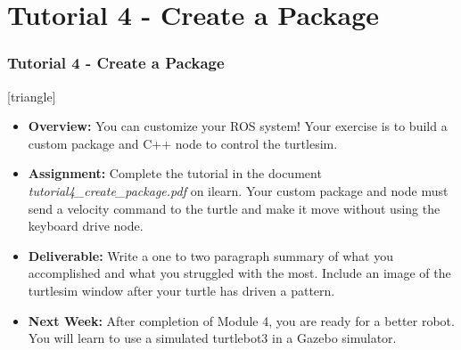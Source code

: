 \documentclass[fleqn]{beamer} %
\newcommand{\sectiontitleIV}{Tutorial 4 - Create a Package}
\begin{document}
\section{\sectiontitleIV}	
	            \begin{frame}[label=sectionIV] \small
		\frametitle{\sectiontitleIV}    
	
 [triangle]
                \begin{itemize}

					\item {\bf Overview:} You can customize your ROS system! Your exercise is to build a custom package and C++ node to control the turtlesim. 		

					\item {\bf Assignment:} Complete the tutorial in the document {\it tutorial4\_create\_package.pdf} on ilearn. Your custom package and node must  send a velocity command to the turtle and make it move without using the keyboard drive node.
                    
                    \item {\bf Deliverable:} Write a one to two paragraph summary of what you accomplished and what you struggled with the most. Include an image of the turtlesim window after your turtle has driven a pattern. 
    
                    \item {\bf Next Week:} After completion of Module 4, you are ready for a better robot. You will learn to use a simulated turtlebot3 in a Gazebo simulator. \vspc
                    
       
                \end{itemize}
		\end{frame}
\end{document}
